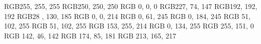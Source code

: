\newcommand{\en}{\selectlanguage{english}}
\newcommand{\gr}{\selectlanguage{greek}}

\newcommand\PlaceText[3]{%
\begin{tikzpicture}[remember picture,overlay]
\node[outer sep=0pt,inner sep=0pt,anchor=south west] 
  at ([xshift=#1,yshift=-#2]current page.north west) {#3};
\end{tikzpicture}%

}
\definecolor{kWhite}         {RGB}{255, 255, 255}
\definecolor{kSnow}          {RGB}{250, 250, 250}
\definecolor{kBlack}         {RGB}{  0,   0,   0}
\definecolor{kPink}          {RGB}{227,  74, 147}
\definecolor{kGray}          {RGB}{192, 192, 192}
\definecolor{kNavyBlue}      {RGB}{28 , 130, 185}
\definecolor{kDarkBlue}      {RGB}{  0,   0, 214}
\definecolor{kLightBlue}     {RGB}{  0,  61, 245}
\definecolor{kvLightBlue}    {RGB}{  0, 184, 245}
\definecolor{kMyBlue}        {RGB}{ 51, 102, 255}
\definecolor{kBlue}          {RGB}{ 51, 102, 255}
\definecolor{kCyan}          {RGB}{ 153, 255, 214}
\definecolor{kCR1}           {RGB}{ 0, 134, 255}
\definecolor{kCR2}           {RGB}{ 255, 151, 0}
\definecolor{kMergedt}       {RGB}{ 142, 46, 142}
\definecolor{kMergedW}       {RGB}{ 174, 85, 181}
\definecolor{kNonMerged}     {RGB}{ 213, 165, 217}

